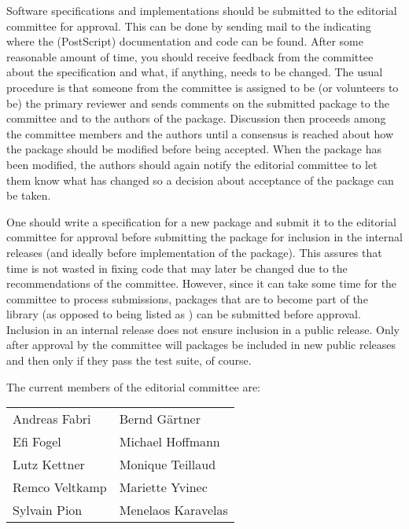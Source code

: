 Software specifications and implementations should be submitted to the 
editorial committee for approval.  This can be done by sending mail to 
the 
 indicating
where the (PostScript) documentation and code can be found.  After
some reasonable amount of time, you should receive feedback from 
the committee about the specification and what, if anything, needs to
be changed. The usual procedure is that someone from the committee is
assigned to be (or volunteers to be) the primary reviewer and sends 
comments on the submitted package to the committee and to the authors of
the package.  Discussion then proceeds among the committee members and the
authors until a consensus is reached about how the package should be
modified before being accepted.  When the package has been modified,
the authors should again notify the editorial committee to let them
know what has changed so a decision about acceptance of the package
can be taken.  


One should write a specification for a new package
and submit it to the editorial committee for 
approval before submitting the package for inclusion in the internal
releases (and ideally before implementation of the package).  This
assures that time is not wasted in fixing code that may later be changed
due to the recommendations of the committee.
However, since it can take some time for the committee to process
submissions, packages that are to become part of the library 
(as opposed to being listed as 
)
can be submitted 
 before approval.
Inclusion in an internal release does not ensure inclusion in a public
release.  Only after approval by the committee will packages be included in new
public releases and then only if they pass the test suite, of course.

The current members of the editorial committee are:
\begin{center}
\begin{tabular}{p{5cm}p{5cm}}
Andreas Fabri          & Bernd G\"artner  \\
Efi Fogel              & Michael Hoffmann \\
Lutz Kettner           & Monique Teillaud  \\
Remco Veltkamp         & Mariette Yvinec  \\
Sylvain Pion           & Menelaos Karavelas
\end{tabular}
\end{center}

